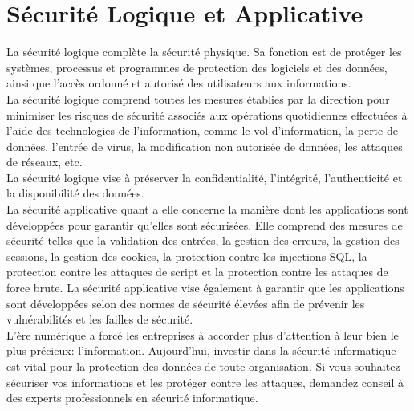  \section*{Sécurité Logique et Applicative}
 La sécurité logique complète la sécurité physique. Sa fonction est de protéger les systèmes, processus et programmes de protection des logiciels et des données, ainsi que l’accès ordonné et autorisé des utilisateurs aux informations.\\
  La sécurité logique comprend toutes les mesures établies par la direction pour minimiser les risques de sécurité associés aux opérations quotidiennes effectuées à l’aide des technologies de l’information, comme le vol d’information, la perte de données, l’entrée de virus, la modification non autorisée de données, les attaques de réseaux, etc.\\
   La sécurité logique vise à préserver la confidentialité, l’intégrité, l’authenticité et la disponibilité des données.\\
 
 La sécurité applicative quant a elle  concerne la manière dont les applications sont développées pour garantir qu'elles sont sécurisées. Elle comprend des mesures de sécurité telles que la validation des entrées, la gestion des erreurs, la gestion des sessions, la gestion des cookies, la protection contre les injections SQL, la protection contre les attaques de script et la protection contre les attaques de force brute. La sécurité applicative vise également à garantir que les applications sont développées selon des normes de sécurité élevées afin de prévenir les vulnérabilités et les failles de sécurité.\\
 
 L’ère numérique a forcé les entreprises à accorder plus d’attention à leur bien le plus précieux: l’information. Aujourd’hui, investir dans la sécurité informatique est vital pour la protection des données de toute organisation. Si vous souhaitez sécuriser vos informations et les protéger contre les attaques, demandez conseil à des experts professionnels en sécurité informatique.
 
